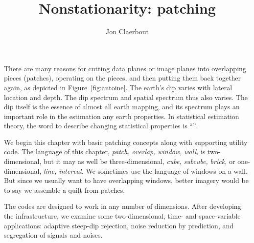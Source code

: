 
\title{Nonstationarity: patching}
\author{Jon Claerbout}
\maketitle
{}

\label{paper:pch}

There are many reasons
for cutting data planes or image planes into overlapping pieces (patches),
operating on the pieces, and then putting them back together again,
as depicted in Figure~\ref{fig:antoine}.
The earth's dip varies with lateral location and depth. 
The dip spectrum and spatial spectrum thus also varies.
The dip itself is the essence of almost all earth mapping,
and its spectrum plays an important role
in the estimation any earth properties.
In statistical estimation theory,
the word to describe changing statistical properties is ``''.



\par
We begin this chapter with basic patching concepts
along with supporting utility code.
The language of this chapter,
{\it patch,}
{\it overlap,}
{\it window,}
{\it wall,}
is two-dimensional,
but it may as well be three-dimensional,
{\it cube,}
{\it subcube,}
{\it brick,}
or one-dimensional,
{\it line,}
{\it interval.}
We sometimes use the language of windows on a wall.
But since we usually want to have overlapping windows,
better imagery would be to say we assemble a quilt from patches.
\par
The codes are designed to work in any number of dimensions.
After developing the infrastructure,
we examine some two-dimensional, time- and space-variable applications:
adaptive steep-dip rejection,
noise reduction by prediction,
and segregation of signals and noises.

